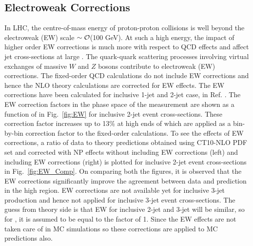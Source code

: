 \subsection{Electroweak Corrections}
\label{sec:EW}
In LHC, the centre-of-mass energy of proton-proton collisions is well beyond the electroweak (EW) scale $\sim{\cal O}$(100 GeV). At such a high energy, the impact of higher order EW corrections is much more with respect to QCD effects \cite{Hollik:2004dz} and affect jet cross-sections at large \httwo. The quark-quark scattering processes involving virtual exchanges of massive $W$ and $Z$ bosons contribute to electroweak (EW) corrections. The fixed-order QCD calculations do not include EW corrections and hence the NLO theory calculations are corrected for EW effects. The EW corrections have been calculated for inclusive 1-jet and 2-jet case, in Ref. \cite{Dittmaier:2012kx}. The EW correction factors in the phase space of the measurement are shown as a function of \httwo in Fig.~\ref{fig:EW} for inclusive 2-jet event cross-sections. These correction factor increases up to 13\% at high ends of \httwo which are applied as a bin-by-bin correction factor to the fixed-order \NLOJETPP calculations. To see the effects of EW corrections, a ratio of data to theory predictions obtained using CT10-NLO PDF set and corrected with NP effects without including EW corrections (left) and including EW corrections (right) is plotted for inclusive 2-jet event cross-sections in Fig.~\ref{fig:EW_Comp}. On comparing both the figures, it is observed that the EW corrections significantly improve the agreement between data and prediction in the high \httwo region. EW corrections are not available yet for inclusive 3-jet production and hence not applied for inclusive 3-jet event cross-sections. The guess from theory side is that EW for inclusive 2-jet and 3-jet will be similar, so for \ratio, it is assumed to be equal to the factor of 1. Since the EW effects are not taken care of in MC simulations so these corrections are applied to MC predictions also. 

